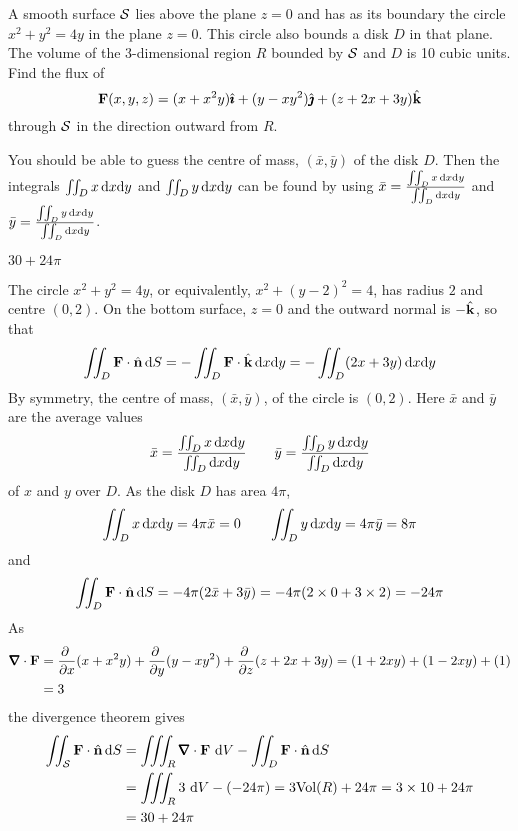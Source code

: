 \begin{question}[M317 2000A] %
A smooth surface $\mathcal{S}$ lies above the plane $z=0$ and has
as its boundary the circle $x^2+y^2=4y$ in the plane $z=0$. This circle
also bounds a disk $D$ in that plane. The volume of the 3-dimensional region
$R$ bounded by $\mathcal{S}$ and $D$ is 10 cubic units. Find the flux of
$$
\mathbf{F}(x,y,z)=(x+x^2y)\hat{\pmb{\imath}}+(y-xy^2)\hat{\pmb{\jmath}}+(z+2x+3y)\hat{\mathbf{k}}
$$
through $\mathcal{S}$ in the direction outward from $R$.
\end{question}

\begin{hint} 
You should be able to guess the centre of mass, $(\bar x,\bar y)$
of the disk $D$. Then the integrals $\iint_D x\,\mathrm{d}x\mathrm{d}y$
and $\iint_D y\,\mathrm{d}x\mathrm{d}y$ can be found by using
$\bar x = \frac{\iint_D x\,\mathrm{d}x\mathrm{d}y}{\iint_D \mathrm{d}x\mathrm{d}y}$
and
$\bar y = \frac{\iint_D y\,\mathrm{d}x\mathrm{d}y}{\iint_D \mathrm{d}x\mathrm{d}y}$.
\end{hint}

\begin{answer} 
$30+24\pi$
\end{answer}

\begin{solution} 
The circle $x^2+y^2=4y$, or equivalently, $x^2+(y-2)^2=4$, has radius
$2$ and centre $(0,2)$.
On the bottom surface, $z=0$ and 
the outward normal is $-\hat{\mathbf{k}}$, so that
$$
\iint_{D}\mathbf{F}\cdot\hat{\mathbf{n}}\,\mathrm{d}S
=-\iint_{D}\mathbf{F}\cdot\hat{\mathbf{k}}\,\mathrm{d}x\mathrm{d}y
=-\iint_D(2x+3y)\,\mathrm{d}x\mathrm{d}y
$$
By symmetry, the centre of mass, $(\bar x,\bar y)$, of the circle
is $(0,2)$. Here $\bar x$ and $\bar y$ are the average values
\begin{align*}
\bar x = \frac{\iint_D x\,\mathrm{d}x\mathrm{d}y}{\iint_D \mathrm{d}x\mathrm{d}y}\qquad
\bar y = \frac{\iint_D y\,\mathrm{d}x\mathrm{d}y}{\iint_D \mathrm{d}x\mathrm{d}y}
\end{align*}
of $x$ and $y$ over $D$.
As the disk $D$ has area $4\pi$,
\begin{equation*}
\iint_D x\,\mathrm{d}x\mathrm{d}y =4\pi\bar x =0\qquad
\iint_D y\,\mathrm{d}x\mathrm{d}y =4\pi\bar y =8\pi
\end{equation*}
and
$$
\iint_{D}\mathbf{F}\cdot\hat{\mathbf{n}}\,\mathrm{d}S
=-4\pi(2\bar x+3\bar y)
=-4\pi(2\times 0+3\times 2)
=-24\pi
$$
As
\begin{align*}
\vnabla\cdot\vF
&=\pdiff{}{x}(x+x^2y)
+\pdiff{}{y}(y-xy^2)
+\pdiff{}{z}(z+2x+3y)
=(1+2xy)+(1-2xy)+(1)\\
&=3
\end{align*}
the divergence theorem gives
\begin{align*}
\dblInt_{\cS}\vF\cdot\hn\,\dee{S}
&=\tripInt_R\vnabla\cdot\vF\ \dee{V}
-\dblInt_{D}\vF\cdot\hn\,\dee{S}\\
&=\tripInt_R3\ \dee{V}
-(-24\pi)
=3\text{Vol}(R)+24\pi
=3\times10+24\pi \\
&=30+24\pi
\end{align*}

\end{solution}

